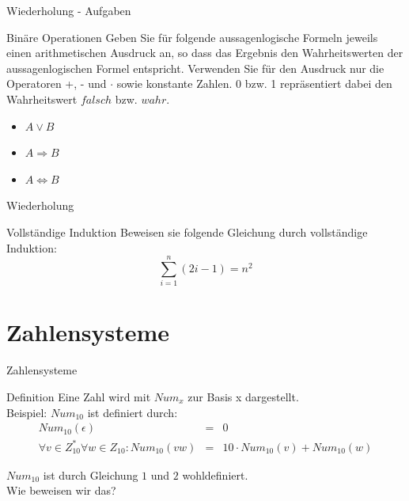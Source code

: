 	
	
	\begin{frame} {Wiederholung - Aufgaben}
		\begin{block}{Binäre Operationen}
			Geben Sie für folgende aussagenlogische Formeln jeweils einen 
			arithmetischen Ausdruck an, so dass das Ergebnis 
			den Wahrheitswerten der aussagenlogischen Formel entspricht. 
			Verwenden Sie für den Ausdruck nur die Operatoren +, - und 
			$\cdot$ sowie konstante Zahlen. 0 bzw. 1 repräsentiert dabei den
			 Wahrheitswert $falsch$ bzw. $wahr$.
			 
			 \begin{itemize}
			 	\item $ A \lor B$
			 	
			 	\item $ A \Rightarrow B $
			 	
			 	\item $ A \Leftrightarrow B $
			 \end{itemize}
		\end{block}
	\end{frame}
	
	
	
	\begin{frame} {Wiederholung}
		\begin{block}{Vollständige Induktion}
			Beweisen sie folgende Gleichung durch vollständige Induktion:\\
			\[ \sum_{i=1}^{n}(2i-1) = n^2 \]
		\end{block}
	\end{frame}
	
	
	
	\section{Zahlensysteme}
	\begin{frame}{Zahlensysteme}
		\begin{block}{Definition}
			Eine Zahl wird mit $Num_x$ zur Basis x dargestellt.\\
			
			\pause
			Beispiel: $Num_{10}$ ist definiert durch:\\
			
			
			\begin{align}
			Num_{10}(\epsilon) &=& 0 \\
			\forall v \in Z_{10}^*\forall w \in Z_{10} : Num_{10}(vw) 
			&=& 10 \cdot Num_{10}(v) + Num_{10}(w)
			\end{align}
			
		\end{block}
		
		\begin{Lemma}
			$Num_{10}$ ist durch Gleichung $1$ und $2$ wohldefiniert.\\
			\pause
			Wie beweisen wir das?
		\end{Lemma}
	\end{frame}
	
